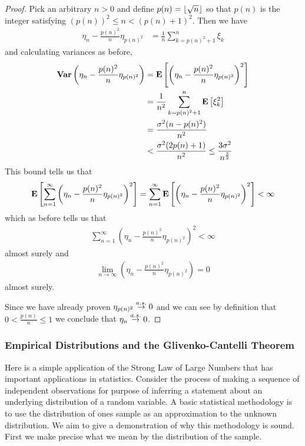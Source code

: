 \begin{proof}
Pick an arbitrary $n > 0$ and define $p(n) = \lfloor \sqrt{n} \rfloor$ so that
$p(n)$ is the integer satisfying $(p(n))^2 \leq n < (p(n) + 1)^2$.
Then we have
\begin{align*}
\eta_n - \frac{p(n)^2}{n} \eta_{p(n)^2} &= \frac{1}{n}\sum_{k=p(n)^2 + 1}^n \xi_k
\end{align*}
and calculating variances as before,
\begin{align*}
\textbf{Var} \left (\eta_n - \frac{p(n)^2}{n} \eta_{p(n)^2} \right ) &=
\textbf{E}\left[\left ( \eta_n - \frac{p(n)^2}{n} \eta_{p(n)^2} \right
  )^2\right] \\
&=
\frac{1}{n^2}\sum_{k=p(n)^2 + 1}^n \textbf{E}\left[\xi_k^2\right] \\
&= \frac{\sigma^2 (n - p(n)^2)}{n^2} \\
&< \frac{\sigma^2 (2 p(n) + 1)}{n^2} \leq \frac{3\sigma^2}{n^\frac{3}{2}}
\end{align*}
This bound tells us that 
\begin{align*}
 \textbf{E}\left[ \sum_{n=1}^\infty \left ( \eta_n - \frac{p(n)^2}{n} \eta_{p(n)^2} \right
  )^2\right] = \sum_{n=1}^\infty \textbf{E}\left[\left ( \eta_n - \frac{p(n)^2}{n} \eta_{p(n)^2} \right
  )^2\right]  < \infty
\end{align*}
which as before tells us that 
\begin{align*}
\sum_{n=1}^\infty \left ( \eta_n - \frac{p(n)^2}{n} \eta_{p(n)^2} \right
  )^2 < \infty 
\end{align*}
almost surely and 
\begin{align*}
\lim_{n\to \infty} \left ( \eta_n - \frac{p(n)^2}{n} \eta_{p(n)^2}
\right ) = 0
\end{align*}
almost surely.

Since we have already proven $\eta_{p(n)^2} \overset{a.s.}\to 0$ and we can see by
definition that $0 < \frac{p(n)}{n} \leq 1$ we conclude that $\eta_n
\overset{a.s.}\to 0$.
\end{proof}

\subsubsection{Empirical Distributions and the Glivenko-Cantelli Theorem}

Here is a simple application of the Strong Law of Large Numbers that
has important applications in statistics.  Consider the process of
making a sequence of independent observations for purpose of inferring
a statement about an underlying distribution of a random variable.  A
basic statistical methodology is to use the distribution of ones
sample as an approximation to the unknown distribution.  We aim to
give a demonstration of why this methodology is sound.  First we make
precise what we mean by the distribution of the sample.

